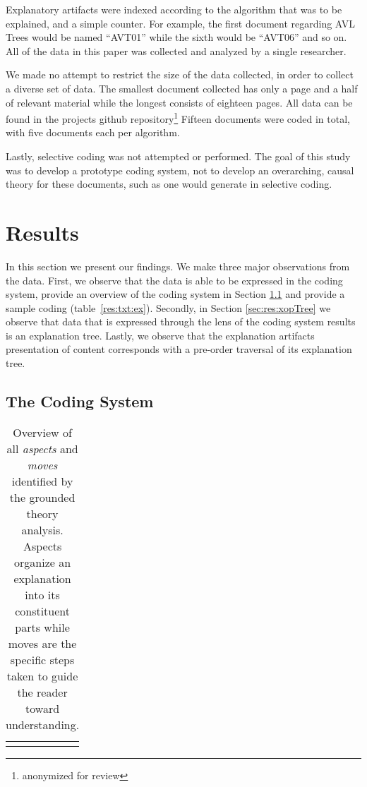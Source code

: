 \documentclass[sigconf]{acmart}
\begin{document}
Explanatory artifacts were indexed according to the algorithm that was to be
explained, and a simple counter. For example, the first document regarding AVL
Trees would be named ``AVT01'' while the sixth would be ``AVT06'' and so on.
All of the data in this paper was collected and analyzed by a single researcher.

We made no attempt to restrict the size of the data collected, in order to
collect a diverse set of data. The smallest document collected has only a page
and a half of relevant material while the longest consists of eighteen pages.
All data can be found in the projects github repository\footnote[1]{anonymized
  for review}  Fifteen
documents were coded in total, with five documents each per algorithm.

Lastly, selective coding was not attempted or performed. The goal of this study
was to develop a prototype coding system, not to develop an overarching, causal
theory for these documents, such as one would generate in selective coding.

\section{Results}
In this section we present our findings. We make three major observations from
the data. First, we observe that the data is able to be expressed in the coding
system, provide an overview of the coding system in Section \ref{sec:res:sys}
and provide a sample coding (table~\ref{res:txt:ex}). Secondly, in Section
\ref{sec:res:xopTree} we observe that data that is expressed through the lens of
the coding system results is an explanation tree. Lastly, we observe that the
explanation artifacts presentation of content corresponds with a pre-order
traversal of its explanation tree.

\subsection{The Coding System}
\label{sec:res:sys}

\begin{table}
\begin{tabular}{ll}

\\[-1.5ex]

\\[-1.5ex]
\end{tabular}
\caption{Overview of all \emph{aspects} and \emph{moves} identified by the grounded theory
analysis. Aspects organize an explanation into its constituent parts while
moves are the specific steps taken to guide the reader toward understanding.}
\label{tbl:codes:main}
\end{table}
\end{document}
